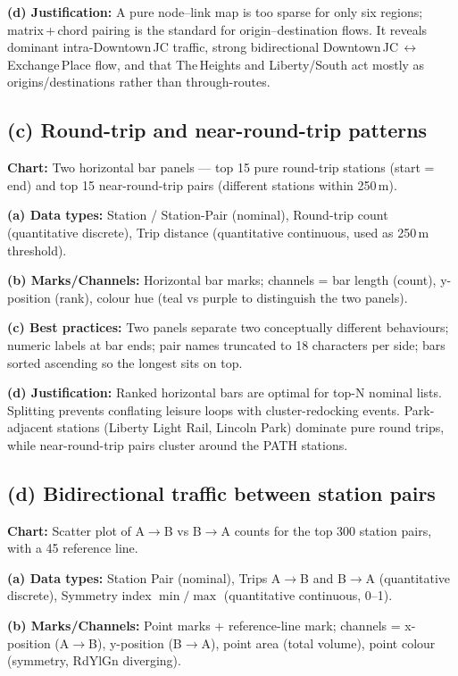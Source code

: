 \documentclass[11pt, a4paper]{article}
\begin{document}
\textbf{(d) Justification:} A pure node--link map is too sparse for only six regions; matrix\,+\,chord pairing is the standard for origin--destination flows. It reveals dominant intra-Downtown\,JC traffic, strong bidirectional Downtown\,JC\,$\leftrightarrow$\,Exchange\,Place flow, and that The\,Heights and Liberty/South act mostly as origins/destinations rather than through-routes.

\subsection{(c) Round-trip and near-round-trip patterns}
\textbf{Chart:} Two horizontal bar panels --- top 15 pure round-trip stations (start = end) and top 15 near-round-trip pairs (different stations within 250\,m).

\textbf{(a) Data types:} Station / Station-Pair (nominal), Round-trip count (quantitative discrete), Trip distance (quantitative continuous, used as 250\,m threshold).

\textbf{(b) Marks/Channels:} Horizontal bar marks; channels = bar length (count), y-position (rank), colour hue (teal vs purple to distinguish the two panels).

\textbf{(c) Best practices:} Two panels separate two conceptually different behaviours; numeric labels at bar ends; pair names truncated to 18 characters per side; bars sorted ascending so the longest sits on top.

\textbf{(d) Justification:} Ranked horizontal bars are optimal for top-N nominal lists. Splitting prevents conflating leisure loops with cluster-redocking events. Park-adjacent stations (Liberty Light Rail, Lincoln Park) dominate pure round trips, while near-round-trip pairs cluster around the PATH stations.

\subsection{(d) Bidirectional traffic between station pairs}
\textbf{Chart:} Scatter plot of A$\to$B vs B$\to$A counts for the top 300 station pairs, with a 45\textdegree{} reference line.

\textbf{(a) Data types:} Station Pair (nominal), Trips A$\to$B and B$\to$A (quantitative discrete), Symmetry index $\min/\max$ (quantitative continuous, 0--1).

\textbf{(b) Marks/Channels:} Point marks + reference-line mark; channels = x-position (A$\to$B), y-position (B$\to$A), point area (total volume), point colour (symmetry, RdYlGn diverging).
\end{document}
